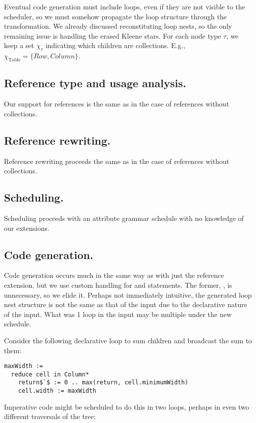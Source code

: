 Eventual code generation must include loops, even if they are not visible to the scheduler, so we must somehow propagate the loop structure through the transformation. We already discussed reconstituting loop nests, so the only remaining issue is handling the erased Kleene stars.  For each node type $\tau$, we keep a set $\chi_{\tau}$ indicating which children are collections. E.g., $\chi_{\text{Table}} = \{Row, Column\}$.

\subsection{Reference type and usage analysis.}
Our support for references is the same as in the case of references without collections. 
\subsection{Reference rewriting.}
Reference rewriting proceeds the same as in the case of references without collections.
\subsection{Scheduling.}
Scheduling proceeds with an attribute grammar schedule with no knowledge of our extensions.

\subsection{Code generation.}
Code generation occurs much in the same way as with just the reference extension, but we use custom handling for  and  statements. The former, , is unnecessary, so we elide it. Perhaps not immediately intuitive, the generated loop nest structure is not the same as that of the input due to the declarative nature of the input. What was 1 loop in the input may be multiple under the new schedule. 

Consider the following declarative loop to sum children and broadcast the sum to them:

\begin{lstlisting}[mathescape]
maxWidth := 
  reduce cell in Column*
    return$`$ := 0 .. max(return, cell.minimumWidth)
    cell.width := maxWidth
\end{lstlisting}

Imperative code might be scheduled to do this in two loops, perhaps in even two different traversals of the tree:

